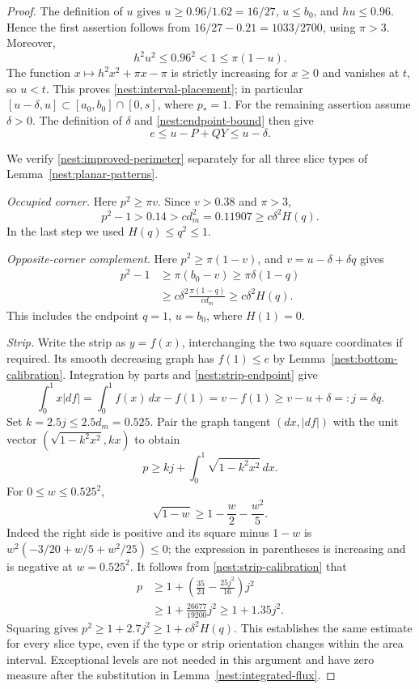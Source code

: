 \begin{proof}
The definition of $u$ gives $u\geq0.96/1.62=16/27$,
$u\leq b_0$, and $hu\leq0.96$.  Hence the first assertion follows
from $16/27-0.21=1033/2700$, using $\pi>3$.
Moreover,
\[
 h^2u^2\leq0.96^2<1\leq\pi(1-u).
\]
The function $x\mapsto h^2x^2+\pi x-\pi$ is strictly increasing
for $x\geq0$ and vanishes at $t$, so $u<t$.
This proves \eqref{nest:interval-placement}; in particular
$[u-\delta,u]\subset[a_0,b_0]\cap[0,s]$, where $p_*=1$.
For the remaining assertion assume $\delta>0$. The definition of
$\delta$ and \eqref{nest:endpoint-bound} then give
\begin{equation}\label{nest:strip-endpoint}
 e\leq u-P+QY\leq u-\delta.
\end{equation}

We verify \eqref{nest:improved-perimeter} separately for all three
slice types of Lemma~\ref{nest:planar-patterns}.

\emph{Occupied corner.}
Here $p^2\geq\pi v$.  Since $v>0.38$ and $\pi>3$,
\[
 p^2-1>0.14>c d_m^2=0.11907\geq c\delta^2H(q).
\]
In the last step we used $H(q)\leq q^2\leq1$.

\emph{Opposite-corner complement.}
Here $p^2\geq\pi(1-v)$, and $v=u-\delta+\delta q$ gives
\[
 \begin{split}
 p^2-1&\geq\pi(b_0-v)
 \geq\pi\delta(1-q)\\
 &\geq c\delta^2\frac{\pi(1-q)}{c d_m}
 \geq c\delta^2H(q).
 \end{split}
\]
This includes the endpoint $q=1$, $u=b_0$, where $H(1)=0$.

\emph{Strip.}
Write the strip as $y=f(x)$, interchanging the two square coordinates
if required.  Its smooth decreasing graph has $f(1)\leq e$ by
Lemma~\ref{nest:bottom-calibration}.  Integration by parts and
\eqref{nest:strip-endpoint} give
\[
 \int_0^1x|df|=\int_0^1f(x)\,dx-f(1)
    =v-f(1)\geq v-u+\delta=:j=\delta q.
\]
Set $k=2.5j\leq2.5d_m=0.525$.  Pair the graph tangent
$(dx,|df|)$ with the unit vector
$(\sqrt{1-k^2x^2},kx)$ to obtain
\begin{equation}\label{nest:strip-calibration}
 p\geq kj+\int_0^1\sqrt{1-k^2x^2}\,dx.
\end{equation}
For $0\leq w\leq0.525^2$,
\[
 \sqrt{1-w}\geq1-\frac w2-\frac{w^2}5.
\]
Indeed the right side is positive and its square minus $1-w$ is
$w^2(-3/20+w/5+w^2/25)\leq0$; the expression in parentheses is
increasing and is negative at $w=0.525^2$.
It follows from \eqref{nest:strip-calibration} that
\[
 \begin{split}
 p&\geq1+\left(\frac{35}{24}-\frac{25j^2}{16}\right)j^2\\
  &\geq1+\frac{26677}{19200}j^2
   \geq1+1.35j^2.
 \end{split}
\]
Squaring gives $p^2\geq1+2.7j^2\geq1+c\delta^2H(q)$.
This establishes the same estimate for every slice type, even if
the type or strip orientation changes within the area interval.
Exceptional levels are not needed in this argument and have zero
measure after the substitution in Lemma~\ref{nest:integrated-flux}.
\end{proof}

